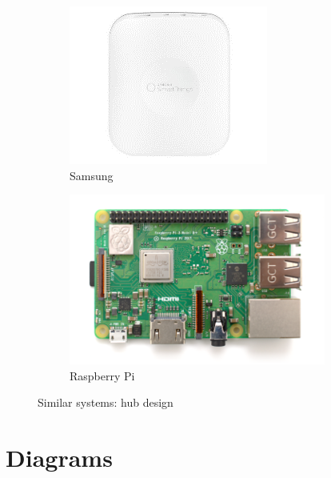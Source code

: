 \documentclass[12pt]{paper}
\begin{document}
\begin{figure}[H]
			\begin{subfigure}[b]{.5\linewidth}
				\includegraphics[width=\linewidth]{img/samsung_hw.png}
				\caption{Samsung}
			\end{subfigure}
			\begin{subfigure}[b]{.5\linewidth}
				\includegraphics[width=\linewidth]{img/raspberry.png}
				\caption{Raspberry Pi}
			\end{subfigure}
			\caption{Similar systems: hub design}
		\end{figure}

		\section{Diagrams}
		\label{appendix:diagram}
\end{document}
